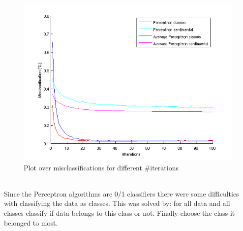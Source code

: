 \begin{figure}[h!]
\centering
\includegraphics[scale = 0.5]{../Plottar/perceptron_2000words_unigram_10foldcv_classes-high_sentimental-low.png}
\caption{Plot over misclassifications for different \#iterations}
\label{fig:number_iterations}
\end{figure}\\
Since the Perceptron algorithms are 0/1 classifiers there were some difficulties with classifying the data as classes. This was solved by: for all data and all classes classify if data belongs to this class or not. Finally choose the class it belonged to most.
